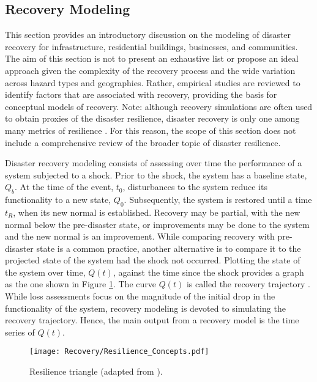 
\begin{partbacktext}
\part{Recovery Modeling}
\label{part:recovery}

This section provides an introductory discussion on the modeling of disaster recovery for infrastructure, residential buildings, businesses, and communities. The aim of this section is not to present an exhaustive list or propose an ideal approach given the complexity of the recovery process and the wide variation across hazard types and geographies. Rather, empirical studies are reviewed to identify factors that are associated with recovery, providing the basis for conceptual models of recovery. Note: although recovery simulations are often used to obtain proxies of the disaster resilience, disaster recovery is only one among many metrics of resilience \citep{national2019building,kwasinski2016conceptual}. For this reason, the scope of this section does not include a comprehensive review of the broader topic of disaster resilience.\

Disaster recovery modeling consists of assessing over time the performance of a system subjected to a shock. Prior to the shock, the system has a baseline state, $Q_b$. At the time of the event, $t_0$, disturbances to the system reduce its functionality to a new state, $Q_0$. Subsequently, the system is restored until a time $t_R$, when its new normal is established. Recovery may be partial, with the new normal below the pre-disaster state, or improvements may be done to the system and the new normal is an improvement. While comparing recovery with pre-disaster state is a common practice, another alternative is to compare it to the projected state of the system had the shock not occurred. Plotting the state of the system over time, $Q(t)$, against the time since the shock provides a graph as the one shown in Figure \ref{fig:ResilienceTriangle}. The curve $Q(t)$ is called the recovery trajectory \citep{Bruneau2003}. While loss assessments focus on the magnitude of the initial drop in the functionality of the system, recovery modeling is devoted to simulating the recovery trajectory. Hence, the main output from a recovery model is the time series of $Q(t)$.\

\begin{figure}[htb]
    \centering
    \texttt{[image: Recovery/Resilience\_Concepts.pdf]}
    \caption{Resilience triangle (adapted from \cite{Bruneau2003}).}
    \label{fig:ResilienceTriangle}
\end{figure}


\end{partbacktext}
